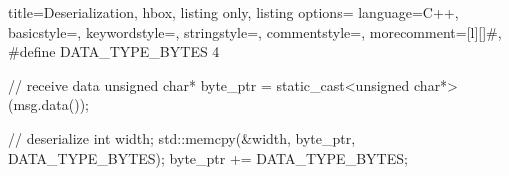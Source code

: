 \documentclass{standalone}
\begin{document}
\begin{tcblisting}{
    title=Deserialization,
    hbox,
    listing only,
    listing options={
      language=C++,
      basicstyle=\ttfamily,
      keywordstyle=\color{blue}\ttfamily,
      stringstyle=\color{red}\ttfamily,
      commentstyle=\color{green}\ttfamily,
      morecomment={[l][\color{magenta}]{\#}},
    }
  }
#define DATA_TYPE_BYTES 4

// receive data
unsigned char* byte_ptr = 
    static_cast<unsigned char*>(msg.data());

// deserialize 
int width;
std::memcpy(&width, byte_ptr, DATA_TYPE_BYTES);
byte_ptr += DATA_TYPE_BYTES;
\end{tcblisting}
\end{document}
